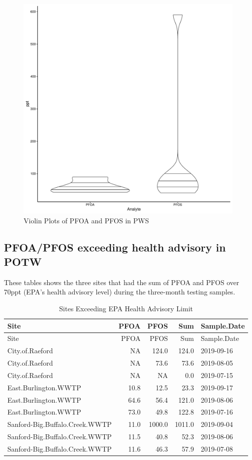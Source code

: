 \documentclass[
  12pt,
]{article}
\begin{document}
\begin{figure}

\includegraphics{PFAS_FinalProject_files/figure-latex/unnamed-chunk-9-1} \hfill{}

\caption{Violin Plots of PFOA and PFOS in PWS}\label{fig:unnamed-chunk-9}
\end{figure}

\hypertarget{pfoapfos-exceeding-health-advisory-in-potw}{%
\subsection{PFOA/PFOS exceeding health advisory in
POTW}\label{pfoapfos-exceeding-health-advisory-in-potw}}

These tables shows the three sites that had the sum of PFOA and PFOS
over 70ppt (EPA's health advisory level) during the three-month testing
samples.

\begin{longtable}[]{@{}lrrrl@{}}
\caption{Sites Exceeding EPA Health Advisory Limit}\tabularnewline
\toprule
Site & PFOA & PFOS & Sum & Sample.Date\tabularnewline
\midrule
\endfirsthead
\toprule
Site & PFOA & PFOS & Sum & Sample.Date\tabularnewline
\midrule
\endhead
City.of.Raeford & NA & 124.0 & 124.0 & 2019-09-16\tabularnewline
City.of.Raeford & NA & 73.6 & 73.6 & 2019-08-05\tabularnewline
City.of.Raeford & NA & NA & 0.0 & 2019-07-15\tabularnewline
East.Burlington.WWTP & 10.8 & 12.5 & 23.3 & 2019-09-17\tabularnewline
East.Burlington.WWTP & 64.6 & 56.4 & 121.0 & 2019-08-06\tabularnewline
East.Burlington.WWTP & 73.0 & 49.8 & 122.8 & 2019-07-16\tabularnewline
Sanford-Big.Buffalo.Creek.WWTP & 11.0 & 1000.0 & 1011.0 &
2019-09-04\tabularnewline
Sanford-Big.Buffalo.Creek.WWTP & 11.5 & 40.8 & 52.3 &
2019-08-06\tabularnewline
Sanford-Big.Buffalo.Creek.WWTP & 11.6 & 46.3 & 57.9 &
2019-07-08\tabularnewline
\bottomrule
\end{longtable}
\end{document}
